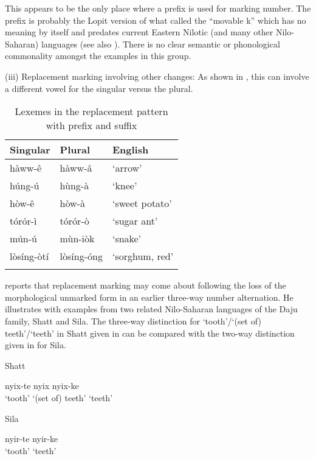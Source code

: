\documentclass[output=paper]{langsci/langscibook}
\begin{document}
This appears to be the only place where a prefix is used for marking number. The prefix is probably the Lopit version of what \citet{Greenberg1981} called the “movable k” which has no meaning by itself and predates current Eastern Nilotic (and many other Nilo-Saharan) languages (see also \citealt[251]{Dimmendaal1983}). There is no clear semantic or phonological commonality amongst the examples in this group.

(iii) Replacement marking involving other changes: As shown in , this can involve a different vowel for the singular versus the plural.

\begin{table}

\begin{tabularx}{.66\textwidth}{XXX}
\lsptoprule

 {Singular} & {Plural} & {English}\\ \midrule
 hàww-\^{e} &  hàww-\^{a} & ‘arrow’\\
 húng-ú &  hùng-à & ‘knee’\\
 hòw-\^{e} &  hòw-à & ‘sweet potato’\\
 tórór-ì &  tórór-ò & ‘sugar ant’\\
 mún-ú &  mùn-iòk & ‘snake’\\
 lòsíng-òtí &  lòsíng-óng & ‘sorghum, red’\\
\lspbottomrule
\end{tabularx}
\caption{Lexemes in the replacement pattern with prefix and suffix}
\label{tab:moodie:16}
\end{table}

\citet[242]{Dimmendaal2000} reports that replacement marking may come about following the loss of the morphological unmarked form in an earlier three-way number alternation. He illustrates with examples from two related Nilo-Saharan languages of the Daju family, Shatt and Sila. The three-way distinction for ‘tooth’/‘(set of) teeth’/‘teeth’ in Shatt given in  can be compared with the two-way distinction given in  for Sila.

\ea\label{ex:moodie:4}
Shatt \citep[242]{Dimmendaal2000}

\gll nyix-te nyix nyix-ke \\
‘tooth’ {‘(set of) teeth’} ‘teeth’ \\
\z

\ea\label{ex:moodie:5}
Sila \citep[243]{Dimmendaal2000}

\gll nyir-te nyir-ke \\
‘tooth’ ‘teeth’ \\
\z
\end{document}
